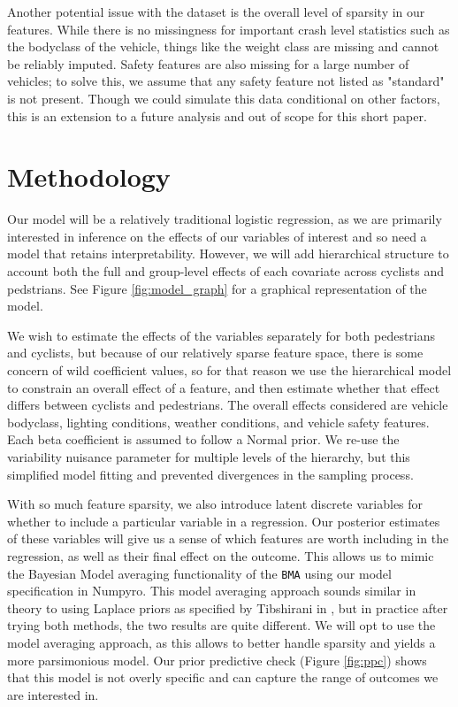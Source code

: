 \documentclass[12pt]{article}
\begin{document}
Another potential issue with the dataset is the overall level of sparsity in our features. While there is no
missingness for important crash level statistics such as the bodyclass of the vehicle, things like the weight class
are missing and cannot be reliably imputed. Safety features are also missing for a large number of vehicles; to solve
this, we assume that any safety feature not listed as "standard" is not present. Though we could simulate this data
conditional on other factors, this is an extension to a future analysis and out of scope for this short paper.

\section{Methodology}

Our model will be a relatively traditional logistic regression, as we are primarily interested in inference on the
effects of our variables of interest and so need a model that retains interpretability. However, we will
add hierarchical structure to account both the full and group-level effects of each covariate across
cyclists and pedstrians. See Figure \ref{fig:model_graph} for a graphical representation of the model.

We wish to estimate the effects of the variables separately for both pedestrians and cyclists, but because of our
relatively sparse feature space, there is some concern of wild coefficient values, so for that reason we use the
hierarchical model to constrain an overall effect of a feature, and then estimate whether that effect differs
between cyclists and pedestrians. The overall effects considered are vehicle bodyclass, lighting conditions, weather
conditions, and vehicle safety features. Each beta coefficient is assumed to follow a Normal prior. We re-use the 
variability nuisance parameter for multiple levels of the hierarchy, but this simplified model fitting and prevented
divergences in the sampling process.

With so much feature sparsity, we also introduce latent discrete variables for whether to include a particular
variable in a regression. Our posterior estimates of these variables will give us a sense of which features
are worth including in the regression, as well as their final effect on the outcome. This allows us to mimic the 
Bayesian Model averaging functionality of the \texttt{BMA}\cite{raftery_bma_2022} using our model specification in 
Numpyro\cite{phan_composable_2019}. This model averaging approach sounds similar in theory to using Laplace priors 
as specified by Tibshirani in \cite{tibshirani_regression_1996}, but in practice after trying both 
methods, the two results are quite different. We will opt to use the model averaging approach, as this allows to 
better handle sparsity and yields a more parsimonious model. Our prior predictive check (Figure \ref{fig:ppc}) 
shows that this model is not overly specific and can capture the range of outcomes we are interested in. 
\end{document}
